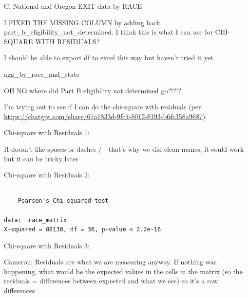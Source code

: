 \documentclass[
  letterpaper,
  DIV=11,
  numbers=noendperiod]{scrartcl}
\begin{document}
C. National and Oregon EXIT data by RACE

I FIXED THE MISSING COLUMN by adding back
part\_b\_eligibility\_not\_determined. I think this is what I can use
for CHI-SQUARE WITH RESIDUALS?

I should be able to export df to excel this way but haven't tried it
yet.

agg\_by\_race\_and\_state

OH NO where did Part B eligibility not determined go?!?!?

I'm trying out to see if I can do the chi-square with residuals (per
\url{https://chatgpt.com/share/67a1833d-9fc4-8012-8193-b6fc358a9687})

Chi-square with Residuals 1:

R doesn't like spaces or dashes / - that's why we did clean names, it
could work but it can be tricky later

Chi-square with Residuals 2:

\begin{verbatim}

    Pearson's Chi-squared test

data:  race_matrix
X-squared = 88130, df = 36, p-value < 2.2e-16
\end{verbatim}

Chi-square with Residuals 3:

Cameron: Residuals are what we are measuring anyway. If nothing was
happening, what would be the expected values in the cells in the matrix
(so the residuals = differences between expected and what we see) so
it's a raw differences
\end{document}
